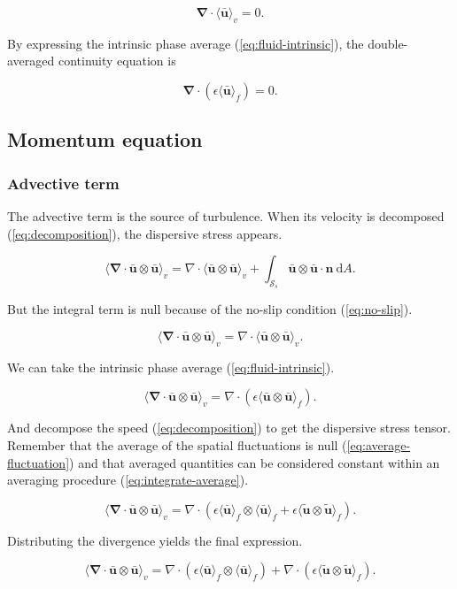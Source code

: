 \documentclass[a4paper,11pt]{article}
\begin{document}
$$\bm\nabla\cdot\langle\bm{\bar u}\rangle_v = 0.$$

By expressing the intrinsic phase average (\autoref{eq:fluid-intrinsic}), the double-averaged continuity equation is

$$\boxed{\bm\nabla\cdot\left(\epsilon\langle\bm{\bar u}\rangle_f\right) = 0.}$$

\subsection{Momentum equation}

\subsubsection{Advective term}

The advective term is the source of turbulence. When its velocity is decomposed (\autoref{eq:decomposition}), the dispersive stress appears.

$$\langle\bm\nabla\cdot \bm{\bar u}\otimes\bm{\bar u}\rangle_v = \nabla\cdot\langle\bm{\bar u}\otimes\bm{\bar u}\rangle_v + \int_{\mathcal S_s}\bm{\bar u}\otimes\bm{\bar u}\cdot\bm n~\mathrm dA.$$

But the integral term is null because of the no-slip condition
(\autoref{eq:no-slip}).

$$\langle\bm\nabla\cdot \bm{\bar u}\otimes\bm{\bar u}\rangle_v = \nabla\cdot\langle\bm{\bar u}\otimes\bm{\bar u}\rangle_v.$$

We can take the intrinsic phase average (\autoref{eq:fluid-intrinsic}).

$$\langle\bm\nabla\cdot \bm{\bar u}\otimes\bm{\bar u}\rangle_v = \nabla\cdot\left(\epsilon\langle\bm{\bar u}\otimes\bm{\bar u}\rangle_f\right).$$

And decompose the speed (\autoref{eq:decomposition}) to get the dispersive stress tensor.
Remember that the average of the spatial fluctuations is null (\autoref{eq:average-fluctuation}) and that averaged quantities can be considered constant within an averaging procedure (\autoref{eq:integrate-average}).

$$\langle\bm\nabla\cdot \bm{\bar u}\otimes\bm{\bar u}\rangle_v = \nabla\cdot\left(\epsilon\langle\bm{\bar u}\rangle_f\otimes\langle\bm{\bar u}\rangle_f + \epsilon\langle \tilde{\bm u}\otimes\tilde{\bm u}\rangle_f\right).$$

Distributing the divergence yields the final expression.

$$\boxed{\langle\bm\nabla\cdot \bm{\bar u}\otimes\bm{\bar u}\rangle_v = \nabla\cdot\left(\epsilon\langle\bm{\bar u}\rangle_f\otimes\langle\bm{\bar u}\rangle_f\right) + \nabla\cdot\left(\epsilon\langle \tilde{\bm u}\otimes\tilde{\bm u}\rangle_f\right).}$$
\end{document}
